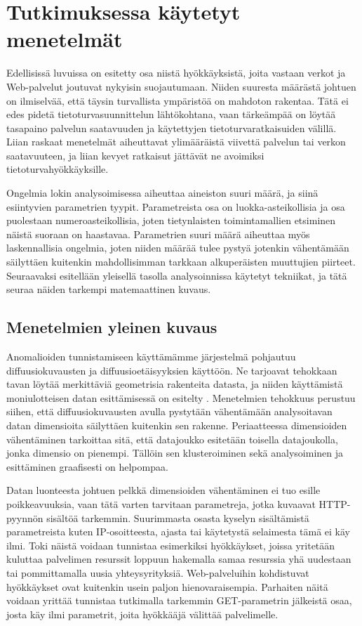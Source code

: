 
\chapter{Tutkimuksessa käytetyt menetelmät}

Edellisissä luvuissa on esitetty osa niistä hyökkäyksistä, joita vastaan verkot ja Web-palvelut joutuvat nykyisin suojautumaan. Niiden suuresta määrästä johtuen on ilmiselvää, että täysin 
turvallista ympäristöä on mahdoton rakentaa. Tätä ei edes pidetä tietoturvasuunnittelun lähtökohtana, vaan tärkeämpää on löytää tasapaino palvelun saatavuuden ja käytettyjen tietoturvaratkaisuiden 
välillä. Liian raskaat menetelmät aiheuttavat ylimääräistä viivettä palvelun tai verkon saatavuuteen, ja liian kevyet ratkaisut jättävät ne avoimiksi tietoturvahyökkäyksille. 

Ongelmia lokin analysoimisessa aiheuttaa aineiston suuri määrä, ja siinä esiintyvien parametrien tyypit. Parametreista osa on luokka-asteikollisia ja osa puolestaan numeroasteikollisia, joten tietynlaisten toimintamallien 
etsiminen näistä suoraan on haastavaa. Parametrien suuri määrä aiheuttaa myös laskennallisia ongelmia, joten niiden määrää tulee pystyä jotenkin vähentämään säilyttäen kuitenkin mahdollisimman tarkkaan alkuperäisten
muuttujien piirteet. Seuraavaksi esitellään yleisellä tasolla analysoinnissa käytetyt tekniikat, ja tätä seuraa näiden tarkempi matemaattinen kuvaus.


\section{Menetelmien yleinen kuvaus}
 
Anomalioiden tunnistamiseen käyttämämme järjestelmä pohjautuu diffuusiokuvausten ja diffuusioetäisyyksien käyttöön. Ne tarjoavat tehokkaan tavan löytää merkittäviä geometrisia rakenteita datasta, ja niiden
käyttämistä moniulotteisen datan esittämisessä on esitelty \cite{diff} \cite{diff2}. Menetelmien tehokkuus perustuu siihen, että diffuusiokuvausten avulla pystytään vähentämään analysoitavan datan dimensioita
säilyttäen kuitenkin sen rakenne. Periaatteessa dimensioiden vähentäminen tarkoittaa sitä, että datajoukko esitetään toisella datajoukolla, jonka dimensio on pienempi. Tällöin sen klusteroiminen sekä 
analysoiminen ja esittäminen graafisesti on helpompaa.

Datan luonteesta johtuen pelkkä dimensioiden vähentäminen ei tuo esille poikkeavuuksia, vaan tätä varten tarvitaan parametreja, jotka kuvaavat HTTP-pyynnön sisältöä tarkemmin. Suurimmasta osasta kyselyn
sisältämistä parametreista kuten IP-osoitteesta, ajasta tai käytetystä selaimesta tämä ei käy ilmi. Toki näistä voidaan tunnistaa esimerkiksi hyökkäykset, joissa yritetään kuluttaa palvelimen resurssit loppuun
hakemalla samaa resurssia yhä uudestaan tai pommittamalla uusia yhteysyrityksiä. Web-palveluihin kohdistuvat hyökkäykset ovat kuitenkin usein paljon hienovaraisempia. Parhaiten näitä voidaan yrittää tunnistaa
tutkimalla tarkemmin GET-parametrin jälkeistä osaa, josta käy ilmi parametrit, joita hyökkääjä välittää palvelimelle. 

